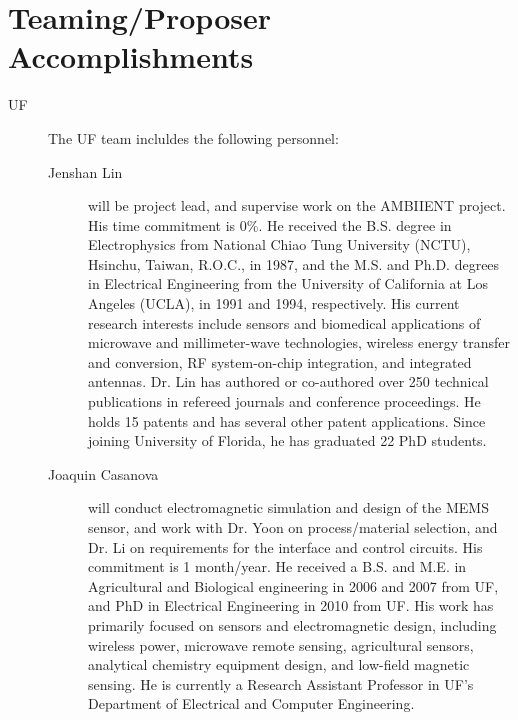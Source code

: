 \section{Teaming/Proposer Accomplishments}

\begin{description}
\item[UF] The UF team incluldes the following personnel:
  \begin{description}
  \item[Jenshan Lin] will be project lead, and supervise work on the AMBIIENT project. His time commitment is 0\%. He received the B.S. degree in Electrophysics from National Chiao Tung University (NCTU), Hsinchu, Taiwan, R.O.C., in 1987, and the M.S. and Ph.D. degrees in Electrical Engineering from the University of California at Los Angeles (UCLA), in 1991 and 1994, respectively. His current research interests include sensors and biomedical applications of microwave and millimeter-wave technologies, wireless energy transfer and conversion, RF system-on-chip integration, and integrated antennas. Dr. Lin has authored or co-authored over 250 technical publications in refereed journals and conference proceedings. He holds 15 patents and has several other patent applications. Since joining University of Florida, he has graduated 22 PhD students. 
  \item[Joaquin Casanova] will conduct electromagnetic simulation and design of the MEMS sensor, and work with Dr. Yoon on process/material selection, and Dr. Li on requirements for the interface and control circuits. His commitment is 1 month/year. He received a B.S. and M.E. in Agricultural and Biological engineering in 2006 and 2007 from UF, and PhD in Electrical Engineering in 2010 from UF. His work has primarily focused on sensors and electromagnetic design, including wireless power, microwave remote sensing, agricultural sensors, analytical chemistry equipment design, and low-field magnetic sensing. He is currently a Research Assistant Professor in UF's Department of Electrical and Computer Engineering. 

\end{description}
\end{description}
